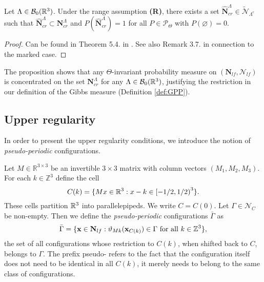 \begin{proposition}\label{prop:cr-a.s.}
Let $\Lambda \in \mathcal B_0({\mathbb R^3})$. Under the range assumption \textbf{(R)}, there exists a set $\hat {\mathbf N}^\Lambda_{cr} \in \tilde {\mathcal N}_{\Lambda^c}$ such that $\hat {\mathbf N}^\Lambda_{cr} \subset \mathbf N^\Lambda_{cr}$ and $P(\hat {\mathbf N}^\Lambda_{cr})=1$ for all $P \in \mathcal P_\Theta$ with $P(\varnothing)=0$.
\end{proposition}
\begin{proof}
	Can be found in Theorem 5.4. in \cite{DDG12}. See also Remark 3.7. in connection to the marked case.
\end{proof}

The proposition shows that any $\Theta$-invariant probability measure on $(\mathbf N_{lf},\mathcal N_{lf})$ is concentrated on the set $\mathbf N^\Lambda_{cr}$ for any $\Lambda \in \mathcal B_0({\mathbb R^3})$, justifying the restriction in our definition of the Gibbs measure (Definition \ref{def:GPP}).  

\subsection{Upper regularity}\label{sec:upperregularity}


In order to present the upper regularity conditions, we introduce the notion of \textit{pseudo-periodic} configurations. 

Let $M\in\mathbb R^{3\times 3}$ be an invertible $3\times 3$ matrix with column vectors $(M_1,M_2,M_3)$. For each $k \in \mathbb Z^3$ define the cell
$$C(k) =  \{Mx \in {\mathbb R^3}: x-k \in \left[ -1/2, 1/2 \right)^3 \}.$$
These cells partition ${\mathbb R^3}$ into parallelepipeds. We write $C=C(0)$. Let $\Gamma \in \mathcal N_C$ be non-empty. Then we define the \textit{pseudo-periodic} configurations $\bar \Gamma$ as
$$\bar \Gamma = \{ {\mathbf{x}} \in \mathbf N_{lf}: \vartheta_{Mk}({\mathbf{x}}_{C(k)}) \in \Gamma \text{ for all } k \in \mathbb Z^3 \},$$
the set of all configurations whose restriction to $C(k)$, when shifted back to $C$, belongs to $\Gamma$. The prefix pseudo- refers to the fact that the configuration itself does not need to be identical in all $C(k)$, it merely needs to belong to the same class of configurations.

